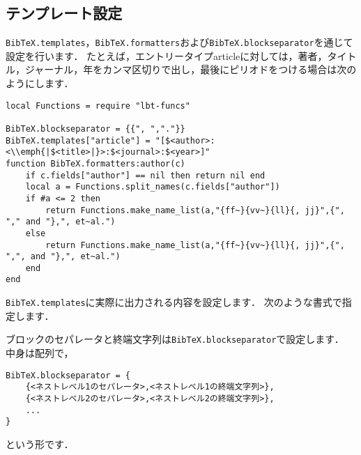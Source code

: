 \documentclass[a4paper]{ltjsarticle}
\newcommand*{\luavar}[1]{\texttt{#1}}
\begin{document}
\subsection{テンプレート設定}\label{subsec:テンプレート設定}
\luavar{BibTeX.templates}，\luavar{BibTeX.formatters}および\luavar{BibTeX.blockseparator}を通じて設定を行います．
たとえば，エントリータイプarticleに対しては，著者，タイトル，ジャーナル，年をカンマ区切りで出し，最後にピリオドをつける場合は次のようにします．
\begin{lstlisting}
local Functions = require "lbt-funcs"

BibTeX.blockseparator = {{", ","."}}
BibTeX.templates["article"] = "[$<author>:<\\emph{|$<title>|}>:$<journal>:$<year>]"
function BibTeX.formatters:author(c)
	if c.fields["author"] == nil then return nil end
	local a = Functions.split_names(c.fields["author"])
	if #a <= 2 then
		return Functions.make_name_list(a,"{ff~}{vv~}{ll}{, jj}",{", "," and "},", et~al.")
	else
		return Functions.make_name_list(a,"{ff~}{vv~}{ll}{, jj}",{", ",", and "},", et~al.")
	end
end
\end{lstlisting}
\luavar{BibTeX.templates}に実際に出力される内容を設定します．
次のような書式で指定します．

ブロックのセパレータと終端文字列は\luavar{BibTeX.blockseparator}で設定します．
中身は配列で，
\begin{lstlisting}
BibTeX.blockseparator = {
    {<ネストレベル1のセパレータ>,<ネストレベル1の終端文字列>},
    {<ネストレベル2のセパレータ>,<ネストレベル2の終端文字列>},
    ...
}
\end{lstlisting}
という形です．
\end{document}
